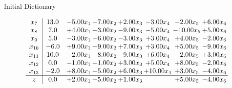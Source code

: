 \documentclass[8pt]{article}
\begin{document}
Initial Dictionary 

\[\begin{array}{c| c c@{\hskip 2pt} c@{\hskip 2pt} c@{\hskip 2pt} c@{\hskip 2pt} c@{\hskip 2pt} c@{\hskip 2pt} }
 x_{7}   &  13.0 & -5.00 x_{1} & -7.00 x_{2} & +  2.00 x_{3} & -3.00 x_{4} & -2.00 x_{5} & +  6.00 x_{6}\\
 x_{8}   &  7.0 & +  4.00 x_{1} & +  3.00 x_{2} & -9.00 x_{3} & -5.00 x_{4} & -10.00 x_{5} & +  5.00 x_{6}\\
 x_{9}   &  5.0 & -3.00 x_{1} & -6.00 x_{2} & -3.00 x_{3} & +  3.00 x_{4} & +  4.00 x_{5} & -2.00 x_{6}\\
 x_{10}   &  -6.0 & +  9.00 x_{1} & +  9.00 x_{2} & +  7.00 x_{3} & +  3.00 x_{4} & +  5.00 x_{5} & -9.00 x_{6}\\
 x_{11}   &  10.0 & -2.00 x_{1} & -8.00 x_{2} & -9.00 x_{3} & +  6.00 x_{4} & -2.00 x_{5} & +  3.00 x_{6}\\
 x_{12}   &  0.0 & -1.00 x_{1} & +  1.00 x_{2} & +  3.00 x_{3} & +  5.00 x_{4} & +  8.00 x_{5} & -2.00 x_{6}\\
 x_{13}   &  -2.0 & +  8.00 x_{1} & +  5.00 x_{2} & +  6.00 x_{3} & + 10.00 x_{4} & +  3.00 x_{5} & -4.00 x_{6}\\
\hline
z    &  0.0 & +  2.00 x_{1} & +  5.00 x_{2} & +  1.00 x_{3} &   & +  5.00 x_{5} & -4.00 x_{6}\\
\end{array}\]
\end{document}
